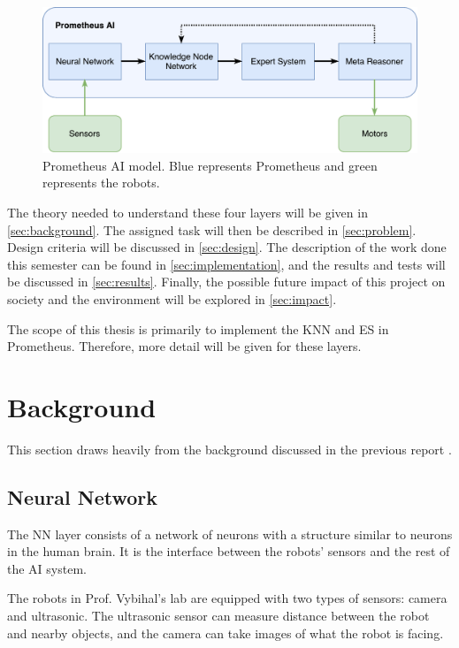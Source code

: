 \documentclass[titlepage,11pt]{article}
\begin{document}
\begin{figure}[!htb]
	\includegraphics[width=\columnwidth]{figures/ai_model.pdf}
	\caption[Prometheus AI model.]{Prometheus AI model. Blue represents Prometheus and green represents the robots.}
	\label{model}
\end{figure}

The theory needed to understand these four layers will be given in \autoref{sec:background}. The assigned task will then be described in \autoref{sec:problem}. Design criteria will be discussed in \autoref{sec:design}. The description of the work done this semester can be found in \autoref{sec:implementation}, and the results and tests will be discussed in \autoref{sec:results}. Finally, the possible future impact of this project on society and the environment will be explored in \autoref{sec:impact}.

The scope of this thesis is primarily to implement the KNN and ES in Prometheus. Therefore, more detail will be given for these layers.

\section{Background} \label{sec:background}
This section draws heavily from the background discussed in the previous report \cite{stappas}.

\subsection{Neural Network}

The NN layer consists of a network of neurons with a structure similar to neurons in the human brain. It is the interface between the robots' sensors and the rest of the AI system.

The robots in Prof. Vybihal's lab are equipped with two types of sensors: camera and ultrasonic. The ultrasonic sensor can measure distance between the robot and nearby objects, and the camera can take images of what the robot is facing.
\end{document}
